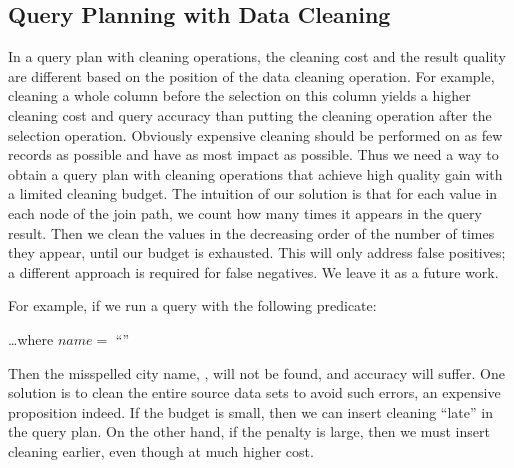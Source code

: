 



\subsection{Query Planning with Data Cleaning}
\label{subsec:gain}


In a query plan with cleaning operations, the cleaning cost and the result quality are different based on the position of the data cleaning operation. For example, cleaning a whole column before the selection on this column yields a higher cleaning cost and query accuracy than putting the cleaning operation after the selection operation. Obviously expensive cleaning should be performed on as few records as possible and have as most impact as possible. 
Thus we need a way to obtain a query plan with cleaning operations that achieve high quality gain with a limited cleaning budget.
The intuition of our solution is that for each value in each node of the join path, we count how many times it appears in the query result. Then we clean the values in the decreasing order of the number of times they appear, until our budget is exhausted. This will only address false positives; a different approach is required for false negatives. We leave it as a future work.








\iffalse
For example, if we run a query with the following predicate:

\vspace{.5em}
\dots \textsf{where} $name = $ ``''
\vspace{.5em}



\noindent Then the misspelled city name,  \ie {}, will not be found, and accuracy will suffer. One solution is to clean the entire source data sets to avoid such errors, an expensive proposition indeed. If the budget is small, then we can insert cleaning ``late'' in the query plan. On the other hand, if the penalty is large, then we must insert cleaning earlier, even though at much higher cost. 

